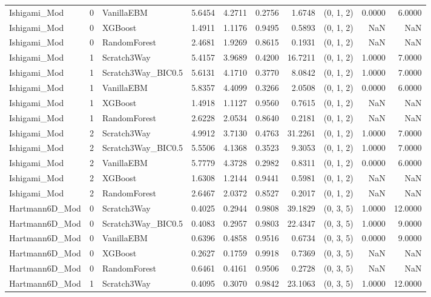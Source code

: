 \begin{tabular}{lrlrrrrlrr}
Ishigami_Mod & 0 & VanillaEBM & 5.6454 & 4.2711 & 0.2756 & 1.6748 & (0, 1, 2) & 0.0000 & 6.0000 \\
Ishigami_Mod & 0 & XGBoost & 1.4911 & 1.1176 & 0.9495 & 0.5893 & (0, 1, 2) & NaN & NaN \\
Ishigami_Mod & 0 & RandomForest & 2.4681 & 1.9269 & 0.8615 & 0.1931 & (0, 1, 2) & NaN & NaN \\
Ishigami_Mod & 1 & Scratch3Way & 5.4157 & 3.9689 & 0.4200 & 16.7211 & (0, 1, 2) & 1.0000 & 7.0000 \\
Ishigami_Mod & 1 & Scratch3Way_BIC0.5 & 5.6131 & 4.1710 & 0.3770 & 8.0842 & (0, 1, 2) & 1.0000 & 7.0000 \\
Ishigami_Mod & 1 & VanillaEBM & 5.8357 & 4.4099 & 0.3266 & 2.0508 & (0, 1, 2) & 0.0000 & 6.0000 \\
Ishigami_Mod & 1 & XGBoost & 1.4918 & 1.1127 & 0.9560 & 0.7615 & (0, 1, 2) & NaN & NaN \\
Ishigami_Mod & 1 & RandomForest & 2.6228 & 2.0534 & 0.8640 & 0.2181 & (0, 1, 2) & NaN & NaN \\
Ishigami_Mod & 2 & Scratch3Way & 4.9912 & 3.7130 & 0.4763 & 31.2261 & (0, 1, 2) & 1.0000 & 7.0000 \\
Ishigami_Mod & 2 & Scratch3Way_BIC0.5 & 5.5506 & 4.1368 & 0.3523 & 9.3053 & (0, 1, 2) & 1.0000 & 7.0000 \\
Ishigami_Mod & 2 & VanillaEBM & 5.7779 & 4.3728 & 0.2982 & 0.8311 & (0, 1, 2) & 0.0000 & 6.0000 \\
Ishigami_Mod & 2 & XGBoost & 1.6308 & 1.2144 & 0.9441 & 0.5981 & (0, 1, 2) & NaN & NaN \\
Ishigami_Mod & 2 & RandomForest & 2.6467 & 2.0372 & 0.8527 & 0.2017 & (0, 1, 2) & NaN & NaN \\
Hartmann6D_Mod & 0 & Scratch3Way & 0.4025 & 0.2944 & 0.9808 & 39.1829 & (0, 3, 5) & 1.0000 & 12.0000 \\
Hartmann6D_Mod & 0 & Scratch3Way_BIC0.5 & 0.4083 & 0.2957 & 0.9803 & 22.4347 & (0, 3, 5) & 1.0000 & 9.0000 \\
Hartmann6D_Mod & 0 & VanillaEBM & 0.6396 & 0.4858 & 0.9516 & 0.6734 & (0, 3, 5) & 0.0000 & 9.0000 \\
Hartmann6D_Mod & 0 & XGBoost & 0.2627 & 0.1759 & 0.9918 & 0.7369 & (0, 3, 5) & NaN & NaN \\
Hartmann6D_Mod & 0 & RandomForest & 0.6461 & 0.4161 & 0.9506 & 0.2728 & (0, 3, 5) & NaN & NaN \\
Hartmann6D_Mod & 1 & Scratch3Way & 0.4095 & 0.3070 & 0.9842 & 23.1063 & (0, 3, 5) & 1.0000 & 12.0000 \\

\end{tabular}
